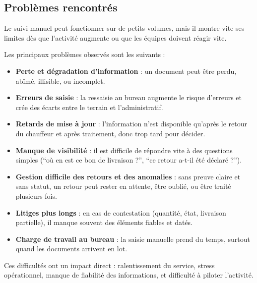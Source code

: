 \documentclass[12pt,a4paper]{article}
\begin{document}
    \subsection{Problèmes rencontrés}
    Le suivi manuel peut fonctionner sur de petits volumes, mais il montre vite ses limites dès que l'activité augmente ou que les équipes doivent réagir vite.

    Les principaux problèmes observés sont les suivants :
    \begin{itemize}[leftmargin=1.2em]
    \item \textbf{Perte et dégradation d'information} : un document peut être perdu, abîmé, illisible, ou incomplet.
    \item \textbf{Erreurs de saisie} : la ressaisie au bureau augmente le risque d'erreurs et crée des écarts entre le terrain et l'administratif.
    \item \textbf{Retards de mise à jour} : l'information n'est disponible qu'après le retour du chauffeur et après traitement, donc trop tard pour décider.
    \item \textbf{Manque de visibilité} : il est difficile de répondre vite à des questions simples (``où en est ce bon de livraison ?'', ``ce retour a-t-il été déclaré ?'').
    \item \textbf{Gestion difficile des retours et des anomalies} : sans preuve claire et sans statut, un retour peut rester en attente, être oublié, ou être traité plusieurs fois.
    \item \textbf{Litiges plus longs} : en cas de contestation (quantité, état, livraison partielle), il manque souvent des éléments fiables et datés.
    \item \textbf{Charge de travail au bureau} : la saisie manuelle prend du temps, surtout quand les documents arrivent en lot.
    \end{itemize}

    Ces difficultés ont un impact direct : ralentissement du service, stress opérationnel, manque de fiabilité des informations, et difficulté à piloter l'activité.
\end{document}
